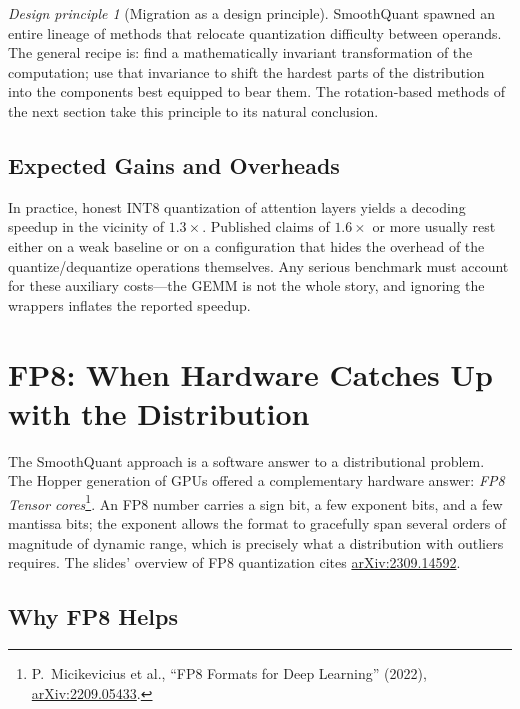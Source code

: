 \documentclass[11pt,a4paper]{article}
\theoremstyle{definition}
\theoremstyle{remark}
\newtheorem*{principle}{Design principle}
\theoremstyle{plain}
\newcommand{\arxivlink}[1]{\href{https://arxiv.org/abs/#1}{arXiv:#1}}
\begin{document}
\begin{principle}[Migration as a design principle]
SmoothQuant spawned an entire lineage of methods that relocate
quantization difficulty between operands. The general recipe is: find a
mathematically invariant transformation of the computation; use that
invariance to shift the hardest parts of the distribution into the
components best equipped to bear them. The rotation-based methods of the
next section take this principle to its natural conclusion.
\end{principle}

\subsection{Expected Gains and Overheads}

In practice, honest INT8 quantization of attention layers yields a
decoding speedup in the vicinity of $1.3\times$. Published claims of
$1.6\times$ or more usually rest either on a weak baseline or on a
configuration that hides the overhead of the quantize/dequantize
operations themselves. Any serious benchmark must account for these
auxiliary costs---the GEMM is not the whole story, and ignoring the
wrappers inflates the reported speedup.

\section{FP8: When Hardware Catches Up with the Distribution}
\label{sec:fp8}

The SmoothQuant approach is a software answer to a distributional problem.
The Hopper generation of GPUs offered a complementary hardware answer:
\emph{FP8 Tensor cores}\footnote{P.\ Micikevicius et al., ``FP8 Formats
for Deep Learning'' (2022), \arxivlink{2209.05433}.}. An FP8 number
carries a sign bit, a few exponent bits, and a few mantissa bits; the
exponent allows the format to gracefully span several orders of magnitude
of dynamic range, which is precisely what a distribution with outliers
requires. The slides' overview of FP8 quantization cites
\href{https://arxiv.org/pdf/2309.14592}{arXiv:2309.14592}.

\subsection{Why FP8 Helps}
\end{document}
